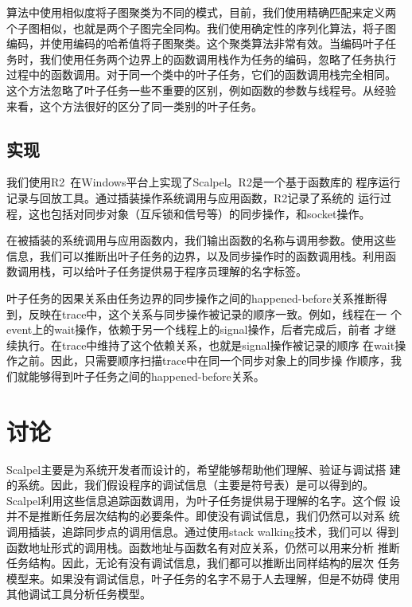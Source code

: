 算法中使用相似度将子图聚类为不同的模式，目前，我们使用精确匹配来定义两
个子图相似，也就是两个子图完全同构。我们使用确定性的序列化算法，将子图
编码，并使用编码的哈希值将子图聚类。这个聚类算法非常有效。当编码叶子任
务时，我们使用任务两个边界上的函数调用栈作为任务的编码，忽略了任务执行
过程中的函数调用。对于同一个类中的叶子任务，它们的函数调用栈完全相同。
这个方法忽略了叶子任务一些不重要的区别，例如函数的参数与线程号。从经验
来看，这个方法很好的区分了同一类别的叶子任务。



\subsection{实现}

我们使用R2~\cite{r2}在Windows平台上实现了Scalpel。R2是一个基于函数库的
程序运行记录与回放工具。通过插装操作系统调用与应用函数，R2记录了系统的
运行过程，这也包括对同步对象（互斥锁和信号等）的同步操作，和socket操作。

在被插装的系统调用与应用函数内，我们输出函数的名称与调用参数。使用这些
信息，我们可以推断出叶子任务的边界，以及同步操作时的函数调用栈。利用函
数调用栈，可以给叶子任务提供易于程序员理解的名字标签。

叶子任务的因果关系由任务边界的同步操作之间的happened-before关系推断得
到，反映在trace中，这个关系与同步操作被记录的顺序一致。例如，线程在一
个event上的wait操作，依赖于另一个线程上的signal操作，后者完成后，前者
才继续执行。在trace中维持了这个依赖关系，也就是signal操作被记录的顺序
在wait操作之前。因此，只需要顺序扫描trace中在同一个同步对象上的同步操
作顺序，我们就能够得到叶子任务之间的happened-before关系。



\section{讨论}

Scalpel主要是为系统开发者而设计的，希望能够帮助他们理解、验证与调试搭
建的系统。因此，我们假设程序的调试信息（主要是符号表）是可以得到的。
Scalpel利用这些信息追踪函数调用，为叶子任务提供易于理解的名字。这个假
设并不是推断任务层次结构的必要条件。即使没有调试信息，我们仍然可以对系
统调用插装，追踪同步点的调用信息。通过使用stack walking技术，我们可以
得到函数地址形式的调用栈。函数地址与函数名有对应关系，仍然可以用来分析
推断任务结构。因此，无论有没有调试信息，我们都可以推断出同样结构的层次
任务模型来。如果没有调试信息，叶子任务的名字不易于人去理解，但是不妨碍
使用其他调试工具分析任务模型。

